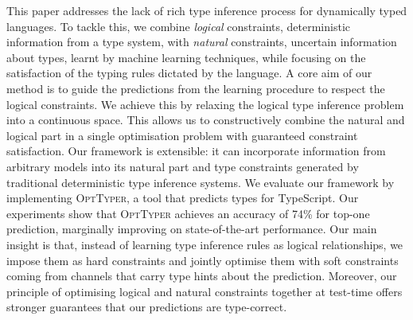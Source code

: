 \documentclass[acmsmall, review, anonymous]{acmart}\settopmatter{printfolios=true,printccs=false,printacmref=false}
\newcommand{\projectname}{\textsc{OptTyper}\xspace}
\begin{document}
This paper addresses the lack of rich type inference process for dynamically typed languages.
To tackle this, we combine \textit{logical} constraints, deterministic information from a type system, with \textit{natural} constraints, uncertain information about types, learnt by machine learning techniques, while focusing on the satisfaction of the typing rules dictated by the language.
A core aim of our method is to guide the predictions from the learning procedure to respect the logical constraints.
We achieve this by relaxing the logical type inference problem into a continuous space.
%
This allows us to constructively combine the natural and logical part in a single optimisation problem with guaranteed constraint satisfaction. 
Our framework is extensible: it can incorporate information from arbitrary models into its natural part and type constraints generated by traditional deterministic type inference systems.
We evaluate our framework by implementing \projectname{}, a tool that predicts types for TypeScript.
Our experiments show that \projectname{} achieves an accuracy of 74\% for top-one prediction, marginally improving on state-of-the-art performance.
Our main insight is that, instead of learning type inference rules as logical relationships, we impose them as hard constraints and jointly optimise them with soft constraints coming from channels that carry type hints about the prediction.
Moreover, our principle of optimising logical and natural constraints together at test-time offers stronger guarantees that our predictions are type-correct.


\end{document}
